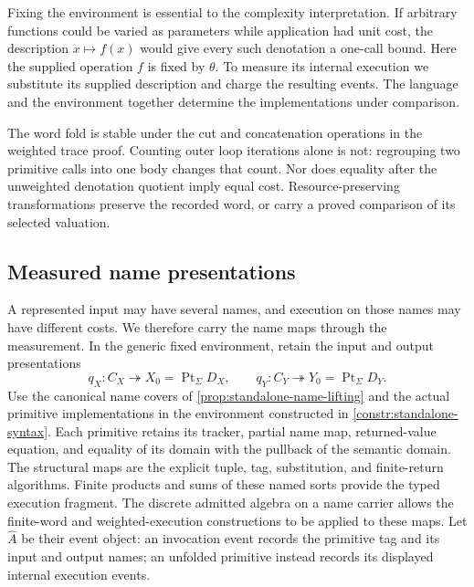 \documentclass[11pt,a4paper]{article}
\numberwithin{algorithm}{section}
\numberwithin{equation}{section}
\theoremstyle{definition}
\theoremstyle{remark}
\theoremstyle{plain}
\newcommand{\Pt}{\operatorname{Pt}_{\Sigma}}
\newcommand{\onto}{\twoheadrightarrow}
\theoremstyle{definition}
\theoremstyle{plain}
\begin{document}
Fixing the environment is essential to the complexity interpretation.
If arbitrary functions could be varied as parameters while application
had unit cost, the description $x\mapsto f(x)$ would give every such
denotation a one-call bound. Here the supplied operation $f$ is fixed by
$\theta$. To measure its internal execution we substitute its supplied
description and charge the resulting events. The language and the
environment together determine the implementations under comparison.

The word fold is stable under the cut and concatenation operations in
the weighted trace proof. Counting outer loop iterations alone is not:
regrouping two primitive calls into one body changes that count. Nor
does equality after the unweighted denotation quotient imply equal
cost. Resource-preserving transformations preserve the recorded word,
or carry a proved comparison of its selected valuation.

\subsection{Measured name presentations}
\label{sec:measured-names}
A represented input may have several names, and execution on those
names may have different costs. We therefore carry the name maps
through the measurement. In the generic fixed environment, retain
the input and output presentations
\[
 q_X:C_X\onto X_0=\Pt D_X,\qquad
 q_Y:C_Y\onto Y_0=\Pt D_Y.
\]
Use the canonical name covers of \cref{prop:standalone-name-lifting}
and the actual primitive implementations in the environment constructed
in \cref{constr:standalone-syntax}. Each primitive retains its tracker,
partial name map, returned-value equation, and equality of its domain
with the pullback of the semantic domain. The structural maps are the
explicit tuple, tag, substitution, and finite-return algorithms. Finite products and
sums of these named sorts provide the typed execution fragment. The
discrete admitted algebra on a name carrier allows the finite-word and
weighted-execution constructions to be applied to these maps.
Let $\widehat A$ be their event object: an invocation event records the
primitive tag and its input and output names; an unfolded primitive
instead records its displayed internal execution events.
\end{document}
